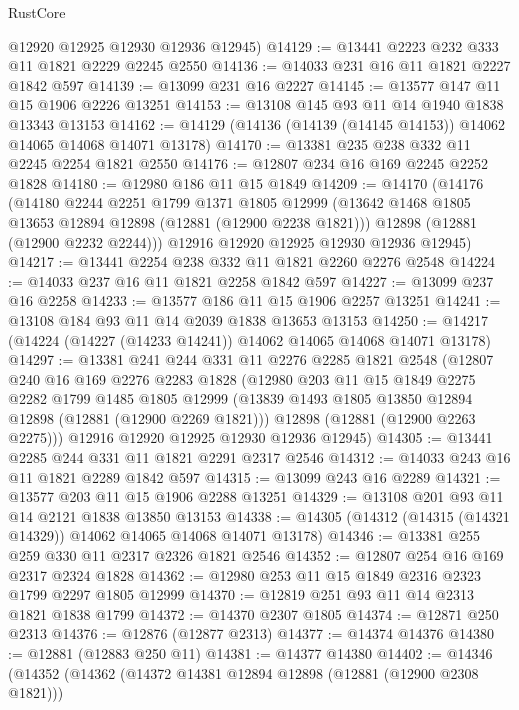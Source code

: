 \begin{lexlean}{RustCore}
\begin{coremodule}
      @12920
      @12925
      @12930
      @12936
      @12945)
@14129 := @13441 @2223 @232 @333 @11 @1821 @2229 @2245 @2550
@14136 := @14033 @231 @16 @11 @1821 @2227 @1842 @597
@14139 := @13099 @231 @16 @2227
@14145 := @13577 @147 @11 @15 @1906 @2226 @13251
@14153 := @13108 @145 @93 @11 @14 @1940 @1838 @13343 @13153
@14162 := @14129 (@14136 (@14139 (@14145 @14153)) @14062 @14065 @14068 @14071 @13178)
@14170 := @13381 @235 @238 @332 @11 @2245 @2254 @1821 @2550
@14176 := @12807 @234 @16 @169 @2245 @2252 @1828
@14180 := @12980 @186 @11 @15 @1849
@14209 := @14170
    (@14176
      (@14180
        @2244
        @2251
        @1799
        @1371
        @1805
        @12999
        (@13642 @1468 @1805 @13653 @12894 @12898 (@12881 (@12900 @2238 @1821)))
        @12898
        (@12881 (@12900 @2232 @2244)))
      @12916
      @12920
      @12925
      @12930
      @12936
      @12945)
@14217 := @13441 @2254 @238 @332 @11 @1821 @2260 @2276 @2548
@14224 := @14033 @237 @16 @11 @1821 @2258 @1842 @597
@14227 := @13099 @237 @16 @2258
@14233 := @13577 @186 @11 @15 @1906 @2257 @13251
@14241 := @13108 @184 @93 @11 @14 @2039 @1838 @13653 @13153
@14250 := @14217 (@14224 (@14227 (@14233 @14241)) @14062 @14065 @14068 @14071 @13178)
@14297 := @13381
    @241
    @244
    @331
    @11
    @2276
    @2285
    @1821
    @2548
    (@12807
      @240
      @16
      @169
      @2276
      @2283
      @1828
      (@12980
        @203
        @11
        @15
        @1849
        @2275
        @2282
        @1799
        @1485
        @1805
        @12999
        (@13839 @1493 @1805 @13850 @12894 @12898 (@12881 (@12900 @2269 @1821)))
        @12898
        (@12881 (@12900 @2263 @2275)))
      @12916
      @12920
      @12925
      @12930
      @12936
      @12945)
@14305 := @13441 @2285 @244 @331 @11 @1821 @2291 @2317 @2546
@14312 := @14033 @243 @16 @11 @1821 @2289 @1842 @597
@14315 := @13099 @243 @16 @2289
@14321 := @13577 @203 @11 @15 @1906 @2288 @13251
@14329 := @13108 @201 @93 @11 @14 @2121 @1838 @13850 @13153
@14338 := @14305 (@14312 (@14315 (@14321 @14329)) @14062 @14065 @14068 @14071 @13178)
@14346 := @13381 @255 @259 @330 @11 @2317 @2326 @1821 @2546
@14352 := @12807 @254 @16 @169 @2317 @2324 @1828
@14362 := @12980 @253 @11 @15 @1849 @2316 @2323 @1799 @2297 @1805 @12999
@14370 := @12819 @251 @93 @11 @14 @2313 @1821 @1838 @1799
@14372 := @14370 @2307 @1805
@14374 := @12871 @250 @2313
@14376 := @12876 (@12877 @2313)
@14377 := @14374 @14376
@14380 := @12881 (@12883 @250 @11)
@14381 := @14377 @14380
@14402 := @14346
    (@14352
      (@14362
        (@14372 @14381 @12894 @12898 (@12881 (@12900 @2308 @1821)))

\end{coremodule}
\end{lexlean}
